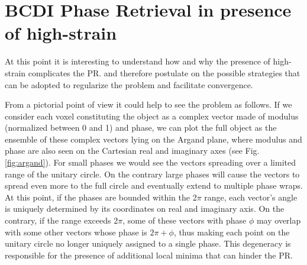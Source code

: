 \section{BCDI Phase Retrieval in presence of high-strain}

At this point it is interesting to understand how and why the presence of high-strain complicates the PR. 
and therefore postulate on the possible strategies that can be adopted to regularize the problem and facilitate convergence. 

From a pictorial point of view it could help to see the problem as follows. If we consider each voxel constituting 
the object as a complex vector made of modulus (normalized between 0 and 1) and phase, we can plot the full object as the 
ensemble of these complex vectors lying on the Argand plane, where modulus and phase are also seen on the Cartesian 
real and imaginary axes (see Fig.\ref{fig:argand}). For small phases we would see 
the vectors spreading over a limited range of the unitary circle. On the contrary large phases will cause the vectors 
to spread even more to the full circle and eventually extend to multiple phase wraps. At this point, if the phases 
are bounded within the 2$\pi$ range, each vector's angle is uniquely determined by 
its coordinates on real and imaginary axis. On the contrary, if the range exceeds 2$\pi$, some of these vectors with 
phase $\phi$ may overlap with some other vectors whose phase is $2\pi + \phi$, thus making each point on the unitary 
circle no longer uniquely assigned to a single phase. This degeneracy is responsible for the presence of additional 
local minima that can hinder the PR. 


